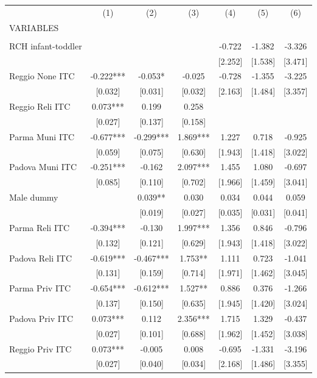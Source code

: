 \begin{tabular}{lcccccc} \hline
 & (1) & (2) & (3) & (4) & (5) & (6) \\
VARIABLES &  &  &  &  &  &  \\ \hline
 &  &  &  &  &  &  \\
RCH infant-toddler &  &  &  & -0.722 & -1.382 & -3.326 \\
 &  &  &  & [2.252] & [1.538] & [3.471] \\
Reggio None ITC & -0.222*** & -0.053* & -0.025 & -0.728 & -1.355 & -3.225 \\
 & [0.032] & [0.031] & [0.032] & [2.163] & [1.484] & [3.357] \\
Reggio Reli ITC & 0.073*** & 0.199 & 0.258 &  &  &  \\
 & [0.027] & [0.137] & [0.158] &  &  &  \\
Parma Muni ITC & -0.677*** & -0.299*** & 1.869*** & 1.227 & 0.718 & -0.925 \\
 & [0.059] & [0.075] & [0.630] & [1.943] & [1.418] & [3.022] \\
Padova Muni ITC & -0.251*** & -0.162 & 2.097*** & 1.455 & 1.080 & -0.697 \\
 & [0.085] & [0.110] & [0.702] & [1.966] & [1.459] & [3.041] \\
Male dummy &  & 0.039** & 0.030 & 0.034 & 0.044 & 0.059 \\
 &  & [0.019] & [0.027] & [0.035] & [0.031] & [0.041] \\
Parma Reli ITC & -0.394*** & -0.130 & 1.997*** & 1.356 & 0.846 & -0.796 \\
 & [0.132] & [0.121] & [0.629] & [1.943] & [1.418] & [3.022] \\
Padova Reli ITC & -0.619*** & -0.467*** & 1.753** & 1.111 & 0.723 & -1.041 \\
 & [0.131] & [0.159] & [0.714] & [1.971] & [1.462] & [3.045] \\
Parma Priv ITC & -0.654*** & -0.612*** & 1.527** & 0.886 & 0.376 & -1.266 \\
 & [0.137] & [0.150] & [0.635] & [1.945] & [1.420] & [3.024] \\
Padova Priv ITC & 0.073*** & 0.112 & 2.356*** & 1.715 & 1.329 & -0.437 \\
 & [0.027] & [0.101] & [0.688] & [1.962] & [1.452] & [3.038] \\
Reggio Priv ITC & 0.073*** & -0.005 & 0.008 & -0.695 & -1.331 & -3.196 \\
 & [0.027] & [0.040] & [0.034] & [2.168] & [1.486] & [3.355] \\

\end{tabular}
